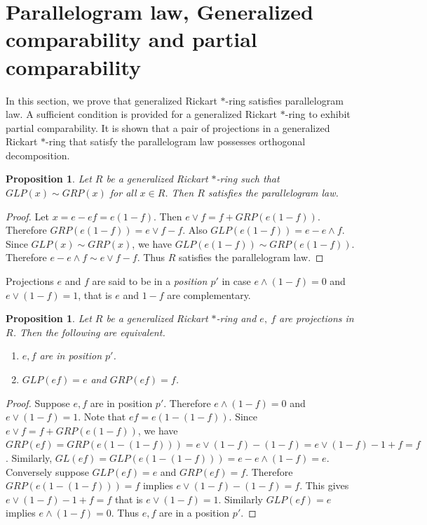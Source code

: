 \documentclass[11pt, one side,emlines]{amsart}
\newtheorem{proposition}[lemma]{Proposition}
\theoremstyle{definition}
\numberwithin{equation}{section} \thispagestyle{empty} \voffset
\begin{document}
\section{Parallelogram law, Generalized comparability and partial comparability}
         
   In this section, we prove that generalized Rickart $*$-ring satisfies parallelogram law. A sufficient condition is provided for a generalized Rickart $*$-ring to exhibit partial comparability. It is shown that a pair of projections in a generalized Rickart $*$-ring that satisfy the parallelogram law possesses orthogonal decomposition. 
          
  \begin{proposition}  Let $R$ be a generalized Rickart $*$-ring such that $GLP(x) \sim GRP(x)$ for all $x \in R$. Then $R$ satisfies the parallelogram law.
  	\end{proposition}
     \begin{proof}  Let $x=e - ef =e(1-f)$. Then $e\vee f=f + GRP(e(1-f))$.
     	Therefore $ GRP(e(1-f))=e \vee f-f$. Also $GLP(e(1-f))=e - e\wedge f$.
     	Since $GLP(x) \sim GRP(x)$, we have $GLP(e(1-f)) \sim GRP(e(1-f))$.
     	Therefore $ e-e\wedge f \sim e \vee f-f$. Thus $R$ satisfies the parallelogram law.
      \end{proof}
      	
      Projections $e$ and $f$ are said to be in a {\it position $p'$} in case $e \wedge (1-f)=0$ and $e \vee (1-f)=1$, that is $e$ and $1-f$ are complementary.
    
      \begin{proposition} \label{s3pr5} Let $R$ be a generalized Rickart $ *$-ring and $e,~f$ are projections in $R$. Then the following are equivalent. 
      	\begin{enumerate}
     \item $e,f$ are in position $p'$.
    \item $GLP(ef)=e$ and $GRP(ef)=f$.
     \end{enumerate}
    \end{proposition}
     \begin{proof} Suppose $e , f$ are in position $p'$.
     	Therefore $e\wedge (1-f)=0$ and $e\vee (1-f)=1$. Note that $ef=e(1-(1-f))$.
     	Since $e\vee f = f+GRP(e(1-f))$, we have
     	 $ GRP(ef)=GRP(e(1-(1-f)))=e\vee (1-f)-(1-f)=e\vee(1-f) - 1  + f = f$.
     	Similarly, $GL(ef) = GLP(e(1 - (1-f)))= e-e \wedge
     	(1-f)=e$. Conversely suppose $GLP(ef)=e$ and $GRP(ef)=f$.
     	Therefore $ GRP(e(1-(1-f)))= f$ implies $e \vee (1-f)-(1-f) = f$.
     	This gives $ e \vee (1-f) - 1+f = f$ that is $e \vee (1-f) = 1$.
     	Similarly $GLP(ef) = e$ implies $e \wedge (1-f) = 0$.
     	Thus $e ,f$ are in a position $p'$.
     \end{proof}
     
\end{document}
